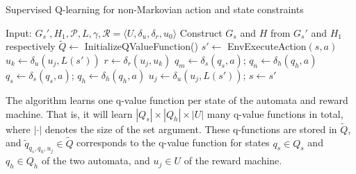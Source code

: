 \documentclass[letterpaper, 10 pt, conference]{ieeeconf}
\begin{document}
\begin{algorithm}
\caption{Supervised Q-learning for non-Markovian action and state constraints}
\label{Algo_1}
\begin{algorithmic}[1]
\STATE Input: ${G_s'}, H_1, \mathcal{P}, L, \gamma, \mathcal{R} = \langle U, \delta_u, \delta_r, u_0 \rangle$
\STATE Construct $G_s$ and $H$ from $G_s'$ and $H_1$ respectively
\STATE \label{init} $\widetilde{Q} \leftarrow$ InitializeQValueFunction()
 \label{numep}
    \label{lenep}
        \ENDIF
    \label{sup}
    \STATE $s' \leftarrow$ EnvExecuteAction$(s, a)$ \label{exe}
    \STATE $u_k \leftarrow \delta_u(u_j, L(s'))$  \label{RMtrans}
    \STATE $r \leftarrow \delta_r(u_j, u_k)$ \label{RMreward}
    \STATE $q_m \leftarrow \delta_s(q_s, a)$; $q_n \leftarrow \delta_h(q_h, a)$
     \label{UpStart}
    \ELSE 
    \ENDIF \label{UpEnd}
    \STATE $q_s \leftarrow \delta_s(q_s, a)$; $q_h \leftarrow \delta_h(q_h, a)$ 
    \STATE $u_j \leftarrow \delta_u(u_j, L(s'))$; $s \leftarrow s'$
        \ENDFOR
\ENDFOR
\end{algorithmic}
\end{algorithm}

The algorithm learns one q-value function per state of the automata and reward machine. That is, it will learn $|Q_s|\times|Q_h| \times |U|$ many q-value functions in total, where $|\cdot|$ denotes the size of the set argument. These q-functions are stored in $\widetilde{Q}$, and $\widetilde{q}_{q_s, q_h, u_j} \in \widetilde{Q}$ corresponds to the q-value function for states $q_s \in Q_s$ and $q_h \in Q_h$ of the two automata, and $u_j \in U$ of the reward machine.
\end{document}

